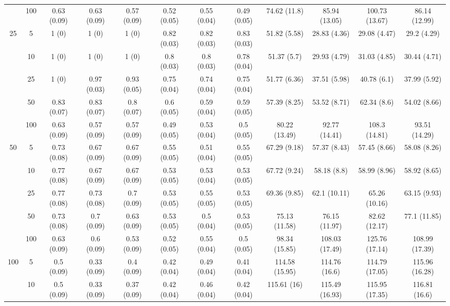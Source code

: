 \documentclass[10pt]{article}
\theoremstyle{definition}
\begin{document}
\begin{table}[H]
\begin{center}
{\begin{tabular}{cc|ccc|ccc|cccc|}
    & 100  & 0.63 (0.09) & 0.63 (0.09) & 0.57 (0.09) & 0.52 (0.05) & 0.55 (0.04) & 0.49 (0.05) & 74.62 (11.8) & 85.94 (13.05) & 100.73 (13.67) & 86.14 (12.99) \\[.3cm]
   \multirow{5}{*}{25}  & 5  & 1 (0) & 1 (0) & 1 (0) & 0.82 (0.03) & 0.82 (0.03) & 0.83 (0.03) & 51.82 (5.58) & 28.83 (4.36) & 29.08 (4.47) & 29.2 (4.29) \\ 
    & 10  & 1 (0) & 1 (0) & 1 (0) & 0.8 (0.03) & 0.8 (0.03) & 0.78 (0.04) & 51.37 (5.7) & 29.93 (4.79) & 31.03 (4.85) & 30.44 (4.71) \\ 
    & 25  & 1 (0) & 0.97 (0.03) & 0.93 (0.05) & 0.75 (0.04) & 0.74 (0.04) & 0.75 (0.04) & 51.77 (6.36) & 37.51 (5.98) & 40.78 (6.1) & 37.99 (5.92) \\ 
    & 50  & 0.83 (0.07) & 0.83 (0.07) & 0.8 (0.07) & 0.6 (0.05) & 0.59 (0.04) & 0.59 (0.05) & 57.39 (8.25) & 53.52 (8.71) & 62.34 (8.6) & 54.02 (8.66) \\ 
    & 100  & 0.63 (0.09) & 0.57 (0.09) & 0.57 (0.09) & 0.49 (0.05) & 0.53 (0.04) & 0.5 (0.05) & 80.22 (13.49) & 92.77 (14.41) & 108.3 (14.81) & 93.51 (14.29) \\[.3cm]
   \multirow{5}{*}{50}  & 5  & 0.73 (0.08) & 0.67 (0.09) & 0.67 (0.09) & 0.55 (0.05) & 0.51 (0.04) & 0.55 (0.05) & 67.29 (9.18) & 57.37 (8.43) & 57.45 (8.66) & 58.08 (8.26) \\ 
    & 10  & 0.77 (0.08) & 0.67 (0.09) & 0.67 (0.09) & 0.53 (0.05) & 0.53 (0.04) & 0.53 (0.05) & 67.72 (9.24) & 58.18 (8.8) & 58.99 (8.96) & 58.92 (8.65) \\ 
   & 25  & 0.77 (0.08) & 0.73 (0.08) & 0.7 (0.09) & 0.53 (0.05) & 0.55 (0.05) & 0.53 (0.05) & 69.36 (9.85) & 62.1 (10.11) & 65.26 (10.16) & 63.15 (9.93) \\ 
    & 50  & 0.73 (0.08) & 0.7 (0.09) & 0.63 (0.09) & 0.53 (0.05) & 0.5 (0.04) & 0.53 (0.05) & 75.13 (11.58) & 76.15 (11.97) & 82.62 (12.17) & 77.1 (11.85) \\ 
    & 100  & 0.63 (0.09) & 0.6 (0.09) & 0.53 (0.09) & 0.52 (0.05) & 0.55 (0.04) & 0.5 (0.05) & 98.34 (15.85) & 108.03 (17.49) & 125.76 (17.14) & 108.99 (17.39) \\[.3cm] 
 \multirow{5}{*}{100}  & 5  & 0.5 (0.09) & 0.33 (0.09) & 0.4 (0.09) & 0.42 (0.04) & 0.49 (0.04) & 0.41 (0.04) & 114.58 (15.95) & 114.76 (16.6) & 114.79 (17.05) & 115.96 (16.28) \\ 
  & 10  & 0.5 (0.09) & 0.33 (0.09) & 0.37 (0.09) & 0.42 (0.04) & 0.46 (0.04) & 0.42 (0.04) & 115.61 (16) & 115.49 (16.93) & 115.95 (17.35) & 116.81 (16.6) \\ 

\end{tabular}}
\end{center}
\end{table}
\end{document}
